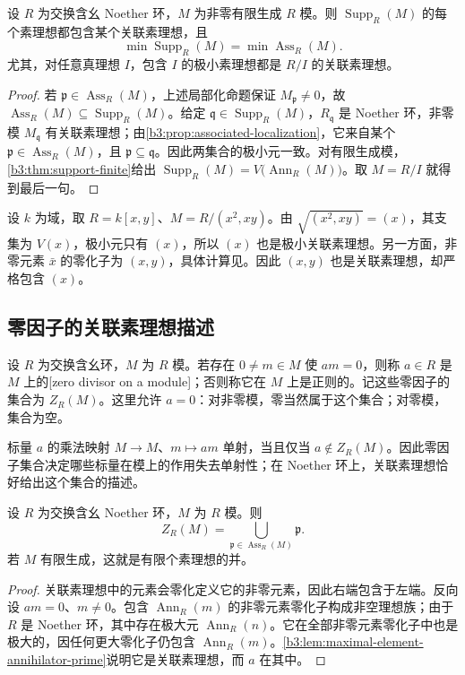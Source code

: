 \begin{proposition}\label{b3:prop:minimal-primes-associated}
	设 \(R\) 为交换含幺 Noether 环，\(M\) 为非零有限生成 \(R\) 模。则 \(\operatorname{Supp}_R(M)\) 的每个素理想都包含某个关联素理想，且
	\[
		\min\operatorname{Supp}_R(M)=\min\operatorname{Ass}_R(M).
	\]
	尤其，对任意真理想 \(I\)，包含 \(I\) 的极小素理想都是 \(R/I\) 的关联素理想。
\end{proposition}
\begin{proof}
	若 \(\mathfrak p\in\operatorname{Ass}_R(M)\)，上述局部化命题保证 \(M_{\mathfrak p}\ne0\)，故 \(\operatorname{Ass}_R(M)\subseteq\operatorname{Supp}_R(M)\)。给定 \(\mathfrak q\in\operatorname{Supp}_R(M)\)，\(R_{\mathfrak q}\) 是 Noether 环，非零模 \(M_{\mathfrak q}\) 有关联素理想；由\cref{b3:prop:associated-localization}，它来自某个 \(\mathfrak p\in\operatorname{Ass}_R(M)\)，且 \(\mathfrak p\subseteq\mathfrak q\)。因此两集合的极小元一致。对有限生成模，\cref{b3:thm:support-finite}给出 \(\operatorname{Supp}_R(M)=V\bigl(\operatorname{Ann}_R(M)\bigr)\)。取 \(M=R/I\) 就得到最后一句。
\end{proof}

设 \(k\) 为域，取 \(R=k[x,y]\)、\(M=R/(x^2,xy)\)。由 \(\sqrt{(x^2,xy)}=(x)\)，其支集为 \(V(x)\)，极小元只有 \((x)\)，所以 \((x)\) 也是极小关联素理想。另一方面，非零元素 \(\bar x\) 的零化子为 \((x,y)\)，具体计算见。因此 \((x,y)\) 也是关联素理想，却严格包含 \((x)\)。

\subsection{零因子的关联素理想描述}
\label{b3:subsec:0401:03}

设 \(R\) 为交换含幺环，\(M\) 为 \(R\) 模。若存在 \(0\ne m\in M\) 使 \(am=0\)，则称 \(a\in R\) 是 \(M\) 上的[zero divisor on a module]；否则称它在 \(M\) 上是正则的。记这些零因子的集合为 \(Z_R(M)\)。这里允许 \(a=0\)：对非零模，零当然属于这个集合；对零模，集合为空。

\ProseParagraphBreak
标量 \(a\) 的乘法映射 \(M\to M\)、\(m\mapsto am\) 单射，当且仅当 \(a\notin Z_R(M)\)。因此零因子集合决定哪些标量在模上的作用失去单射性；在 Noether 环上，关联素理想恰好给出这个集合的描述。

\begin{theorem}\label{b3:thm:associated-zero-divisors}
	设 \(R\) 为交换含幺 Noether 环，\(M\) 为 \(R\) 模。则
	\[
		Z_R(M)=\bigcup_{\mathfrak p\in\operatorname{Ass}_R(M)}\mathfrak p.
	\]
	若 \(M\) 有限生成，这就是有限个素理想的并。
\end{theorem}
\begin{proof}
	关联素理想中的元素会零化定义它的非零元素，因此右端包含于左端。反向设 \(am=0\)、\(m\ne0\)。包含 \(\operatorname{Ann}_R(m)\) 的非零元素零化子构成非空理想族；由于 \(R\) 是 Noether 环，其中存在极大元 \(\operatorname{Ann}_R(n)\)。它在全部非零元素零化子中也是极大的，因任何更大零化子仍包含 \(\operatorname{Ann}_R(m)\)。\cref{b3:lem:maximal-element-annihilator-prime}说明它是关联素理想，而 \(a\) 在其中。
\end{proof}

